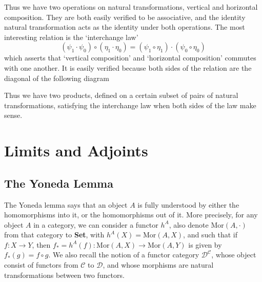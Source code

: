 Thus we have two operations on natural transformations, vertical and horizontal composition. They are both easily verified to be associative, and the identity natural transformation acts as the identity under both operations. The most interesting relation is the `interchange law'
%
\[ (\psi_1 \cdot \psi_0) \circ (\eta_1 \cdot \eta_0) = (\psi_1 \circ \eta_1) \cdot (\psi_0 \circ \eta_0) \]
%
which asserts that `vertical composition' and `horizontal composition' commutes with one another. It is easily verified because both sides of the relation are the diagonal of the following diagram
%
\begin{center}
\end{center}
%
Thus we have two products, defined on a certain subset of pairs of natural transformations, satisfying the interchange law when both sides of the law make sense. 



\chapter{Limits and Adjoints}


\section{The Yoneda Lemma}

The Yoneda lemma says that an object $A$ is fully understood by either the homomorphisms into it, or the homomorphisms out of it. More precisely, for any object $A$ in a category, we can consider a functor $h^A$, also denote $\text{Mor}(A,\cdot)$ from that category to {\bf Set}, with $h^A(X) = \text{Mor}(A,X)$, and such that if $f: X \to Y$, then $f_* = h^A(f): \text{Mor}(A,X) \to \text{Mor}(A,Y)$ is given by $f_*(g) = f \circ g$. We also recall the notion of a functor category $\mathcal{D}^{\mathcal{C}}$, whose object consist of functors from $\mathcal{C}$ to $\mathcal{D}$, and whose morphisms are natural transformations between two functors.

